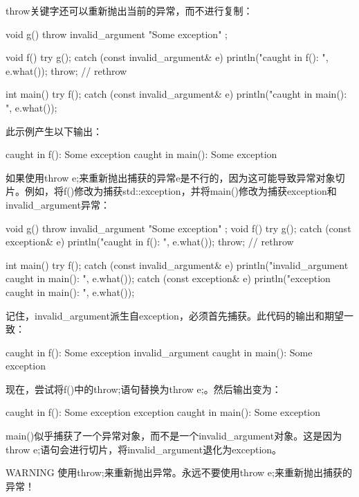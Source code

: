 throw关键字还可以重新抛出当前的异常，而不进行复制：

\begin{cpp}
void g() { throw invalid_argument { "Some exception" }; }

void f()
{
    try {
        g();
    } catch (const invalid_argument& e) {
        println("caught in f(): {}", e.what());
        throw; // rethrow
    }
}

int main()
{
    try {
        f();
    } catch (const invalid_argument& e) {
        println("caught in main(): {}", e.what());
    }
}
\end{cpp}

此示例产生以下输出：

\begin{shell}
caught in f(): Some exception
caught in main(): Some exception
\end{shell}

如果使用throw e;来重新抛出捕获的异常e是不行的，因为这可能导致异常对象切片。例如，将f()修改为捕获std::exception，并将main()修改为捕获exception和invalid\_argument异常：

\begin{cpp}
void g() { throw invalid_argument { "Some exception" }; }
void f()
{
    try {
        g();
        } catch (const exception& e) {
        println("caught in f(): {}", e.what());
        throw; // rethrow
        }
    }

int main()
{
    try {
        f();
    } catch (const invalid_argument& e) {
        println("invalid_argument caught in main(): {}", e.what());
    } catch (const exception& e) {
        println("exception caught in main(): {}", e.what());
    }
}
\end{cpp}

记住，invalid\_argument派生自exception，必须首先捕获。此代码的输出和期望一致：

\begin{shell}
caught in f(): Some exception
invalid_argument caught in main(): Some exception
\end{shell}

现在，尝试将f()中的throw;语句替换为throw e;。然后输出变为：

\begin{shell}
caught in f(): Some exception
exception caught in main(): Some exception
\end{shell}

main()似乎捕获了一个异常对象，而不是一个invalid\_argument对象。这是因为throw e;语句会进行切片，将invalid\_argument退化为exception。

\begin{myWarning}{WARNING}
使用throw;来重新抛出异常。永远不要使用throw e;来重新抛出捕获的异常！
\end{myWarning}















